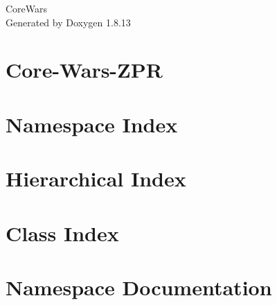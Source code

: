 \documentclass[twoside]{book}
\newcommand{\+}{\discretionary{\mbox{\scriptsize$\hookleftarrow$}}{}{}}
\newcommand{\clearemptydoublepage}{%
  \newpage{\pagestyle{empty}\cleardoublepage}%
}
\begin{document}
\hypersetup{pageanchor=false,
             bookmarksnumbered=true,
             pdfencoding=unicode
            }
\begin{titlepage}
\vspace*{7cm}
\begin{center}%
{\Large Core\+Wars }\\
\vspace*{1cm}
{\large Generated by Doxygen 1.8.13}\\
\end{center}
\end{titlepage}
\clearemptydoublepage
{}
\tableofcontents
\clearemptydoublepage
{}
\hypersetup{pageanchor=true}

\chapter{Core-\/\+Wars-\/\+Z\+PR}
\label{md_README}

\chapter{Namespace Index}

\chapter{Hierarchical Index}

\chapter{Class Index}

\chapter{Namespace Documentation}

\end{document}
